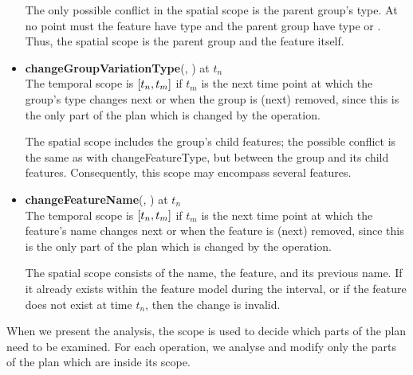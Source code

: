\begin{itemize}
    The only possible conflict in the spatial scope is the parent group's type. At no point must the feature have type \mandatory{} and the parent group have type \xortype{} or \ortype{}. Thus, the spatial scope is the parent group and the feature itself.\\
  \item \textbf{changeGroupVariationType}(, ) at $t_n$\\
    The temporal scope is $\interval{t_n}{t_m}$ if $t_m$ is the next time point at which the group's type changes next or when the group is (next) removed, since this is the only part of the plan which is changed by the operation.

    The spatial scope includes the group's child features; the possible conflict is the same as with changeFeatureType, but between the group and its child features. Consequently, this scope may encompass several features.\\
  \item \textbf{changeFeatureName}(, ) at $t_n$\\
  The temporal scope is $\interval{t_n}{t_m}$ if $t_m$ is the next time point at which the feature's name changes next or when the feature is (next) removed, since this is the only part of the plan which is changed by the operation.

    The spatial scope consists of the name, the feature, and its previous name. If it already exists within the feature model during the interval, or if the feature does not exist at time $t_n$, then the change is invalid. 
\end{itemize}

When we present the analysis, the scope is used to decide which parts of the plan need to be examined. For each operation, we analyse and modify only the parts of the plan which are inside its scope.

